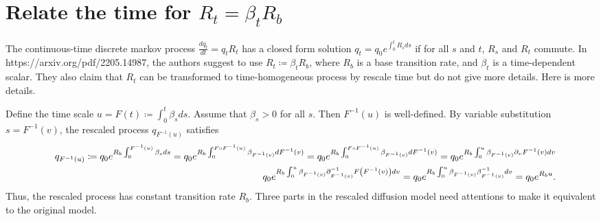 \documentclass[10pt]{article}
\begin{document}
\section{Relate the time for $R_t=\beta_t R_b$}

The continuous-time discrete markov process $\frac{d q_t}{dt}=q_t R_t$ has a closed form solution $q_t = q_0 e^{\int_0^t R_s ds}$ if for all $s$ and $t$, $R_s$ and $R_t$ commute. In https://arxiv.org/pdf/2205.14987, the authors suggest to use $R_t\coloneqq \beta_t R_b$, where $R_b$ is a base transition rate, and $\beta_t$ is a time-dependent scalar. They also claim that $R_t$ can be transformed to time-homogeneous process by rescale time but do not give more details. Here is more details.

Define the time scale $u=F(t)\coloneqq\int_0^t\beta_s ds$. Assume that $\beta_s > 0$ for all $s$. Then $F^{-1}(u)$ is well-defined. By variable substitution $s=F^{-1}(v)$, the rescaled process $q_{F^{-1}(u)}$ satisfies
\begin{eqnarray*}
  &&q_{F^{-1}(u)}\coloneq q_0 e^{R_b \int_0^{F^{-1}(u)}\beta_s ds} = q_0 e^{R_b \int_0^{F\circ F^{-1}(u)}\beta_{F^{-1}(v)} dF^{-1}(v)}=q_0 e^{R_b \int_0^{F\circ F^{-1}(u)}\beta_{F^{-1}(v)} dF^{-1}(v)}=q_0 e^{R_b \int_0^u\beta_{F^{-1}(v)} \partial_v F^{-1}(v)dv}\\
  &&q_0 e^{R_b \int_0^u\beta_{F^{-1}(v)} \partial^{-1}_{F^{-1}(v)} F\qty(F^{-1}(v))dv}=q_0 e^{R_b \int_0^u\beta_{F^{-1}(v)}\beta^{-1}_{F^{-1}(v)}dv} =q_0 e^{R_b u}. 
\end{eqnarray*}
Thus, the rescaled process has constant transition rate $R_b$. Three parts in the rescaled diffusion model need attentions to make it equivalent to the original model.
\end{document}
